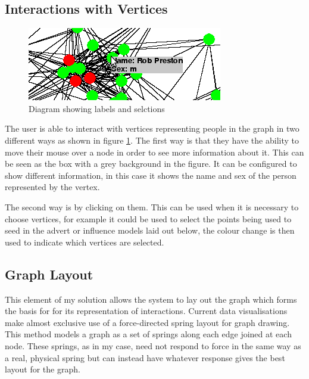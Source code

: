 \documentclass[12pt,a4paper]{article}
\begin{document}
\subsection{Interactions with Vertices}

\begin{figure}[htb]
\centering
\caption{Diagram showing labels and selctions}
\label{fig:labels}
\includegraphics[scale=0.7]{Select.png}
\end{figure}

\noindent
The user is able to interact with vertices representing people in the graph in two different ways as shown in figure \ref{fig:labels}. The first way is that they have the ability to move their mouse over a node in order to see more information about it. This can be seen as the box with a grey background in the figure. It can be configured to show different information, in this case it shows the name and sex of the person represented by the vertex.

The second way is by clicking on them. This can be used when it is necessary to choose vertices, for example it could be used to select the points being used to seed in the advert or influence models laid out below, the colour change is then used to indicate which vertices are selected.

\subsection{Graph Layout}
\noindent
This element of my solution allows the system to lay out the graph which forms the basis for for its representation of interactions. Current data visualisations make almost exclusive use of a force-directed spring layout for graph drawing. This method models a graph as a set of springs along each edge joined at each node. These springs, as in my case, need not respond to force in the same way as a real, physical spring but can instead have whatever response gives the best layout for the graph.
\end{document}
